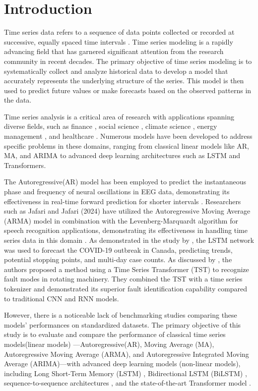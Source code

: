 \documentclass{scrartcl}
\begin{document}
\section{Introduction}

Time series data refers to a sequence of data points collected or recorded at successive, equally spaced time intervals  \cite{adhikari2013introductory}. Time series modeling is a rapidly advancing field that has garnered significant attention from the research community in recent decades. The primary objective of time series modeling is to systematically collect and analyze historical data to develop a model that accurately represents the underlying structure of the series. This model is then used to predict future values or make forecasts based on the observed patterns in the data. 

Time series analysis is a critical area of research with applications spanning diverse fields, such as finance \cite{kim2011time}, social science \cite{box2014time}, climate science \cite{mudelsee2010climate}, energy management \cite{chou2018forecasting}, and healthcare \cite{gao2020time}. Numerous models have been developed to address specific problems in these domains, ranging from classical linear models like AR, MA, and ARIMA to advanced deep learning architectures such as LSTM and Transformers. 


The Autoregressive(AR) model has been employed to predict the instantaneous phase and frequency of neural oscillations in EEG data, demonstrating its effectiveness in real-time forward prediction for shorter intervals \cite{shakeel2020time}. Researchers such as Jafari and Jafari (2024) have utilized the Autoregressive Moving Average (ARMA) model in combination with the Levenberg-Marquardt algorithm for speech recognition applications, demonstrating its effectiveness in handling time series data in this domain \cite{jafari2024speech}. As demonstrated in the study by \cite{chimmula2020time}, the LSTM network was used to forecast the COVID-19 outbreak in Canada, predicting trends, potential stopping points, and multi-day case counts. As discussed by \cite{jin2022time}, the authors proposed a method using a Time Series Transformer (TST) to recognize fault modes in rotating machinery. They combined the TST with a time series tokenizer and demonstrated its superior fault identification capability compared to traditional CNN and RNN models.

However, there is a noticeable lack of benchmarking studies comparing these models' performances on standardized datasets. The primary objective of this study is to evaluate and compare the performance of classical time series models(linear models) \cite{box2015time}—Autoregressive(AR), Moving Average (MA), Autoregressive Moving Average (ARMA), and Autoregressive Integrated Moving Average (ARIMA)—with advanced deep learning models (non-linear models), including Long Short-Term Memory (LSTM) \cite{hochreiter1997lstm}, Bidirectional LSTM (BiLSTM) \cite{graves2005framewise}, sequence-to-sequence architectures \cite{sutskever2014seq2seq}, and the state-of-the-art Transformer model \cite{vaswani2017attention}.
\end{document}
